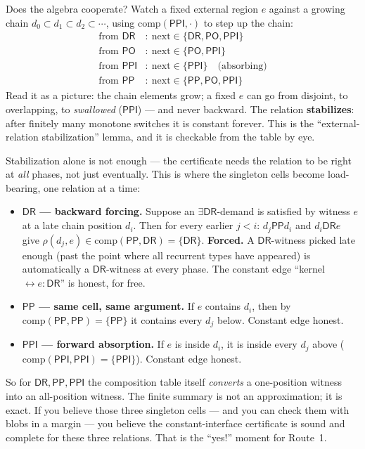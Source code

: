 \documentclass[11pt]{article}
\newcommand{\DR}{\ensuremath{\mathsf{DR}}}
\newcommand{\PO}{\ensuremath{\mathsf{PO}}}
\newcommand{\PP}{\ensuremath{\mathsf{PP}}}
\newcommand{\PPI}{\ensuremath{\mathsf{PPI}}}
\newcommand{\Comp}{\mathrm{comp}}
\begin{document}
Does the algebra cooperate? Watch a fixed external region $e$ against a
growing chain $d_0\subset d_1\subset d_2\subset\cdots$, using
$\Comp(\PPI,\cdot)$ to step up the chain:
\[
\begin{aligned}
\text{from }\DR &:\ \text{next}\in\{\DR,\PO,\PPI\}\\
\text{from }\PO &:\ \text{next}\in\{\PO,\PPI\}\\
\text{from }\PPI&:\ \text{next}\in\{\PPI\}\quad\text{(absorbing)}\\
\text{from }\PP &:\ \text{next}\in\{\PP,\PO,\PPI\}
\end{aligned}
\]
Read it as a picture: the chain elements grow; a fixed $e$ can go from
disjoint, to overlapping, to \emph{swallowed} ($\PPI$) --- and never
backward. The relation \textbf{stabilizes}: after finitely many
monotone switches it is constant forever. This is the
``external-relation stabilization'' lemma, and it is checkable from the
table by eye.

Stabilization alone is not enough --- the certificate needs the
relation to be right at \emph{all} phases, not just eventually. This is
where the singleton cells become load-bearing, one relation at a time:
\begin{itemize}
\item \textbf{$\DR$ --- backward forcing.} Suppose an $\exists\DR$-demand
  is satisfied by witness $e$ at a late chain position $d_i$. Then for
  every earlier $j<i$: $d_j\mathbin{\PP}d_i$ and $d_i\mathbin{\DR}e$
  give $\rho(d_j,e)\in\Comp(\PP,\DR)=\{\DR\}$. \textbf{Forced.} A
  $\DR$-witness picked late enough (past the point where all recurrent
  types have appeared) is automatically a $\DR$-witness at every phase.
  The constant edge ``kernel${}\leftrightarrow e:\DR$'' is honest, for
  free.
\item \textbf{$\PP$ --- same cell, same argument.} If $e$ contains
  $d_i$, then by $\Comp(\PP,\PP)=\{\PP\}$ it contains every $d_j$
  below. Constant edge honest.
\item \textbf{$\PPI$ --- forward absorption.} If $e$ is inside $d_i$,
  it is inside every $d_j$ above ($\Comp(\PPI,\PPI)=\{\PPI\}$).
  Constant edge honest.
\end{itemize}

So for $\DR,\PP,\PPI$ the composition table itself \emph{converts} a
one-position witness into an all-position witness. The finite summary
is not an approximation; it is exact. If you believe those three
singleton cells --- and you can check them with blobs in a margin ---
you believe the constant-interface certificate is sound and complete
for these three relations. That is the ``yes!'' moment for Route~1.
\end{document}
